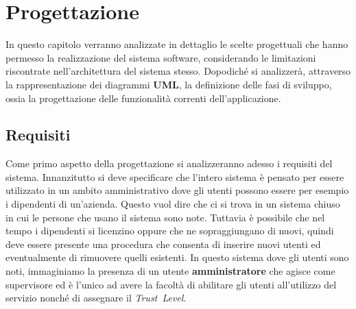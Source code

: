 \def \ti{\textit}
\def \bf{\textbf}

\chapter{Progettazione}
	\label{cap:progettazione}
	
    In questo capitolo verranno analizzate in dettaglio le scelte progettuali che hanno permesso la realizzazione del sistema software, considerando le limitazioni riscontrate nell'architettura del sistema stesso. Dopodiché si analizzerà, attraverso la rappresentazione dei diagrammi \textbf{UML}, la definizione delle fasi di sviluppo, ossia la progettazione delle funzionalità correnti dell'applicazione.

\section{Requisiti}
	\label{sec:requisiti}
	Come primo aspetto della progettazione si analizzeranno adesso i requisiti del sistema. Innanzitutto si deve specificare che l'intero sistema è pensato per essere utilizzato in un ambito amministrativo dove gli utenti possono essere per esempio i dipendenti di un'azienda. Questo vuol dire che ci si trova in un sistema chiuso in cui le persone che usano il sistema sono note. Tuttavia è possibile che nel tempo i dipendenti si licenzino oppure che ne sopraggiungano di nuovi, quindi deve essere presente una procedura che consenta di inserire nuovi utenti ed eventualmente di rimuovere quelli esistenti. In questo sistema dove gli utenti sono noti, immaginiamo la presenza di un utente \textbf{amministratore} che agisce come supervisore ed è l'unico ad avere la facoltà di abilitare gli utenti all'utilizzo del servizio nonché di assegnare il \emph{Trust~Level}.

